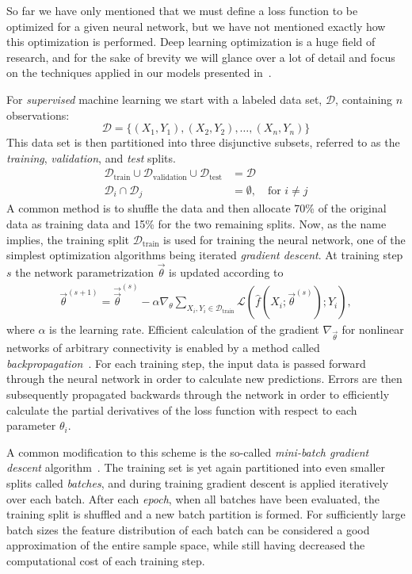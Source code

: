 So far we have only mentioned that we must define a loss function to be optimized for a given neural network, but we have not mentioned exactly how this optimization is performed.
Deep learning optimization is a huge field of research, and for the sake of brevity we will glance over a lot of detail and focus on the techniques applied in our models presented in~.

For \textit{supervised} machine learning we start with a labeled data set, $\mathcal{D}$, containing $n$ observations:
%
\begin{equation*}
  \mathcal{D} = \{(X_1, Y_1), (X_2, Y_2), \ldots, (X_n, Y_n)\}
\end{equation*}
%
This data set is then partitioned into three disjunctive subsets, referred to as the \textit{training}, \textit{validation}, and \textit{test} splits.
%
\begin{align*}
  \mathcal{D}_{\mathrm{train}} \cup \mathcal{D}_{\mathrm{validation}} \cup \mathcal{D}_{\mathrm{test}} &= \mathcal{D}\\
  \mathcal{D}_i \cap \mathcal{D}_j &= \emptyset,~~~\text{ for } i \neq j
\end{align*}
%
A common method is to shuffle the data and then allocate 70\% of the original data as training data and 15\% for the two remaining splits.
Now, as the name implies, the training split $\mathcal{D}_{\mathrm{train}}$ is used for training the neural network, one of the simplest optimization algorithms being iterated \textit{gradient descent}.
At training step $s$ the network parametrization $\vec{\theta}$ is updated according to
%
\begin{align*}
  \vec{\theta}^{(s + 1)}
  =
    \vec{\vec{\theta}}^{(s)}
    -
    \alpha \nabla_{\theta}
      \sum_{X_i, Y_i \in \mathcal{D}_{\mathrm{train}}}
      \mathcal{L}(\hat{f}(X_i; \vec{\theta}^{(s)}); Y_i)
  ,
\end{align*}
%
where $\alpha$ is the learning rate.
Efficient calculation of the gradient $\nabla_{\vec{\theta}}$ for nonlinear networks of arbitrary connectivity is enabled by a method called \textit{backpropagation}~\cite{backpropagation}.
For each training step, the input data is passed forward through the neural network in order to calculate new predictions.
Errors are then subsequently propagated backwards through the network in order to efficiently calculate the partial derivatives of the loss function with respect to each parameter $\theta_i$.

A common modification to this scheme is the so-called \textit{mini-batch gradient descent} algorithm~\cite{gradient-descent}.
The training set is yet again partitioned into even smaller splits called \textit{batches}, and during training gradient descent is applied iteratively over each batch.
After each \textit{epoch}, when all batches have been evaluated, the training split is shuffled and a new batch partition is formed.
For sufficiently large batch sizes the feature distribution of each batch can be considered a good approximation of the entire sample space, while still having decreased the computational cost of each training step.

